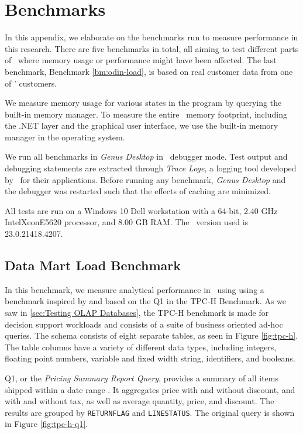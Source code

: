 \chapter{Benchmarks}
\label{app:bm}

In this appendix, we elaborate on the benchmarks run to measure performance in this research. There are five benchmarks in total, all aiming to test different parts of \gap~where memory usage or performance might have been affected. The last benchmark, Benchmark \ref{bm:odin-load}, is based on real customer data from one of \genus' customers.

We measure memory usage for various states in the program by querying the built-in  memory manager. To measure the entire \gap~memory footprint, including the .NET layer and the graphical user interface, we use the built-in memory manager in the  operating system. 

We run all benchmarks in \textit{Genus Desktop} in \delphi~debugger mode. Test output and debugging statements are extracted through \textit{Trace Loge}, a logging tool developed by \genus~for their applications. Before running any benchmark, \textit{Genus Desktop} and the debugger was restarted such that the effects of caching are minimized.

All tests are run on a Windows 10 Dell workstation with a 64-bit, 2.40 GHz Intel\textregistered Xeon\textregistered E5620 processor, and 8.00 GB RAM. The \delphi~version used is 23.0.21418.4207. 


\section{Data Mart Load Benchmark}
\label{bm:q1}
In this benchmark, we measure analytical performance in \gap~using using a benchmark inspired by and based on the Q1 in the TPC-H Benchmark. As we saw in \ref{sec:Testing OLAP Databases}, the TPC-H benchmark is made for decision support workloads and consists of a suite of business oriented ad-hoc queries. The schema consists of eight separate tables, as seen in Figure \ref{fig:tpc-h}. The table columns have a variety of different data types, including integers, floating point numbers, variable and fixed width string, identifiers, and booleans.


Q1, or the \textit{Pricing Summary Report Query}, provides a summary of all items shipped within a date range \cite{Transaction_Processing_Performance_Council_TPC2014-ux}. It aggregates price with and without discount, and with and without tax, as well as average quantity, price, and discount. The results are grouped by \texttt{RETURNFLAG} and \texttt{LINESTATUS}. The original query is shown in Figure \ref{fig:tpc-h-q1}.

